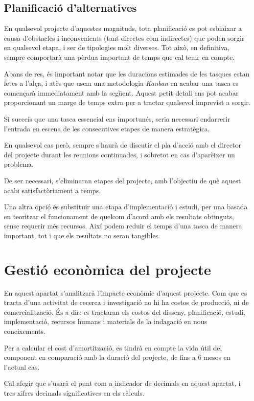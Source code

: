 \documentclass[a4paper]{report}
\begin{document}
	\subsection{Planificació d'alternatives} \label{section:alternatives}
	En qualsevol projecte d'aquestes magnituds, tota planificació es pot esbiaixar a causa d'obstacles i inconvenients (tant directes com indirectes) que poden sorgir en qualsevol etapa, i ser de tipologies molt diverses. Tot això, en definitiva, sempre comportarà una pèrdua important de temps que cal tenir en compte. \par
	Abans de res, és important notar que les duracions estimades de les tasques estan fetes a l'alça, i atès que usem una metodologia \textit{Kanban} en acabar una tasca es començarà immediatament amb la següent. Aquest petit detall ens pot acabar proporcionant un marge de temps extra per a tractar qualsevol imprevist a sorgir.\par
	Si succeís que una tasca essencial ens importunés, seria necessari endarrerir l'entrada en escena de les consecutives etapes de manera estratègica. \par
	En qualsevol cas però, sempre s'haurà de discutir el pla d'acció amb el director del projecte durant les reunions continuades, i sobretot en cas d'aparèixer un problema.\par
	De ser necessari, s'eliminaran etapes del projecte, amb l'objectiu de què aquest acabi satisfactòriament a temps. \par
	Una altra opció és substituir una etapa d'implementació i estudi, per una basada en teoritzar el funcionament de quelcom d'acord amb els resultats obtinguts, sense requerir més recursos. Així podem reduir el temps d'una tasca de manera important, tot i que els resultats no seran tangibles.


	\section{Gestió econòmica del projecte}
	En aquest apartat s'analitzarà l'impacte econòmic d'aquest projecte. Com que es tracta d'una activitat de recerca i investigació no hi ha costos de producció, ni de comercialització. És a dir: es tractaran els costos del disseny, planificació, estudi, implementació, recursos humans i materials de la indagació en nous coneixements. \par 
	Per a calcular el cost d'amortització, es tindrà en compte la vida útil del component en comparació amb la duració del projecte, de fins a 6 mesos en l'actual cas. \par 
	Cal afegir que s'usarà el punt com a indicador de decimals en aquest apartat, i tres xifres decimals significatives en els càlculs.
	
\end{document}
